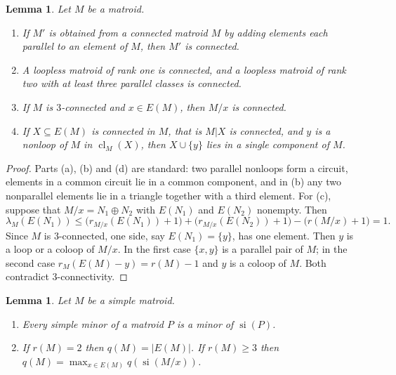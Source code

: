 \documentclass[11pt]{amsart}
\newtheorem{lemma}[theorem]{Lemma}
\theoremstyle{definition}
\theoremstyle{remark}
\numberwithin{equation}{section}
\newcommand{\cl}{\operatorname{cl}}
\newcommand{\si}{\operatorname{si}}
\newcommand{\lam}{\lambda}
\begin{document}
\begin{lemma}\label{lem:basic}
Let $M$ be a matroid.
\begin{enumerate}[label=\textup{(\alph*)}]
\item If $M'$ is obtained from a connected matroid $M$ by adding elements each parallel to an element of $M$, then $M'$ is connected.
\item A loopless matroid of rank one is connected, and a loopless matroid of rank two with at least three parallel classes is connected.
\item If $M$ is $3$-connected and $x\in E(M)$, then $M/x$ is connected.
\item If $X\subseteq E(M)$ is connected in $M$, that is $M|X$ is connected, and $y$ is a nonloop of $M$ in $\cl_M(X)$, then $X\cup\{y\}$ lies in a single component of $M$.
\end{enumerate}
\end{lemma}

\begin{proof}
Parts (a), (b) and (d) are standard: two parallel nonloops form a circuit, elements in a common circuit lie in a common component, and in (b) any two nonparallel elements lie in a triangle together with a third element. For (c), suppose that $M/x=N_1\oplus N_2$ with $E(N_1)$ and $E(N_2)$ nonempty. Then
\[
\lam_M(E(N_1))\le \big(r_{M/x}(E(N_1))+1\big)+\big(r_{M/x}(E(N_2))+1\big)-\big(r(M/x)+1\big)=1.
\]
Since $M$ is $3$-connected, one side, say $E(N_1)=\{y\}$, has one element. Then $y$ is a loop or a coloop of $M/x$. In the first case $\{x,y\}$ is a parallel pair of $M$; in the second case $r_M(E(M)-y)=r(M)-1$ and $y$ is a coloop of $M$. Both contradict $3$-connectivity.
\end{proof}

\begin{lemma}\label{lem:qrec}
Let $M$ be a simple matroid.
\begin{enumerate}[label=\textup{(\alph*)}]
\item Every simple minor of a matroid $P$ is a minor of $\si(P)$.
\item If $r(M)=2$ then $q(M)=|E(M)|$. If $r(M)\ge3$ then $q(M)=\max_{x\in E(M)}q(\si(M/x))$.
\end{enumerate}
\end{lemma}
\end{document}

